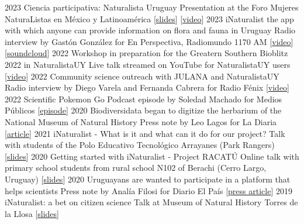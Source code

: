 \documentclass[9pt]{developercv} %
\begin{document}
\begin{entrylist}
	\entrylong
		{2023}
		{Ciencia participativa: Naturalista Uruguay}
		{}
		{Presentation at the Foro Mujeres NaturaListas en México y Latinoamérica [\href{https://flograttarola.com/talk/ciencia-participativa-y-naturalista-uruguay/Foro_mujeres_Mexico_y_Latam.pdf}{slides}] [\href{https://fb.watch/iBdjBHYFQm/}{video}]}
	\entrylong
		{2023}
		{iNaturalist the app with which anyone can provide information on flora and fauna in Uruguay}
		{}
		{Radio interview by Gastón González for En Perspectiva, Radiomundo 1170 AM [\href{https://youtu.be/TcYk9ZquyvE}{video}] [\href{https://soundcloud.com/en-perspectiva-uy/entrevista-florencia-grattarola-naturalistauy-te-invita-a-realizar-ciencia-ciudadana}{soundcloud}]}
	\entrylong
		{2022}
		{Workshop in preparation for the Greatern Southern Bioblitz 2022 in NaturalistaUY}
		{}
		{Live talk streamed on YouTube for NaturalistaUY users [\href{https://youtu.be/sPKhUy3CJQ0}{video}]}
	\entrylong
		{2022}
		{Community science outreach with JULANA and NaturalistaUY}
		{}
		{Radio interview by Diego Varela and Fernanda Cabrera for Radio Fénix [\href{https://youtu.be/Scc01vg1PTs}{video}]}
	\entrylong
		{2022}
		{Scientific Pokemon Go}
		{}
		{Podcast episode by Soledad Machado for Medios Públicos [\href{https://open.spotify.com/episode/05X1u40HyvvTjuuYKjyJE2?si=jCNZ8hHmQ8S-CSfiNOCryQ}{episode}]}
	\entrylong
		{2020}
		{Biodiversidata began to digitize the herbarium of the National Museum of Natural History}
		{}
		{Press note by Leo Lagos for La Diaria [\href{https://ladiaria.com.uy/ciencia/articulo/2020/2/biodiversidata-comenzo-a-digitalizar-el-herbario-del-museo-nacional-de-historia-natural/}{article}]}
	\entrylong
		{2021}
		{iNaturalist - What is it and what can it do for our project?}
		{}
		{Talk with students of the Polo Educativo Tecnológico Arrayanes (Park Rangers) [\href{https://flograttarola.com/pdf/Arrayanes_iNatUY.pdf}{slides}]}
	\entrylong
		{2020}
		{Getting started with iNaturalist - Project RACATÚ}
		{}
		{Online talk with primary school students from rural school N102 of Berachi (Cerro Largo, Uruguay) [\href{https://flograttarola.com/pdf/iNat_Berachi.pdf}{slides}]}
	\entrylong
		{2020}
		{Uruguayans are wanted to participate in a platform that helps scientists}
		{}
		{Press note by Analía Filosi for Diario El País [\href{https://www.elpais.com.uy/vida-actual/busca-uruguayos-participen-plataforma-ayuda-cientificos.html}{press article}]}
	\entrylong
		{2019}
		{iNaturalist: a bet on citizen science}
		{}
		{Talk at Museum of Natural History Torres de la Llosa [\href{https://flograttarola.com/pdf/NaturalistaUy.pdf}{slides}]}

\end{entrylist}
\end{document}
